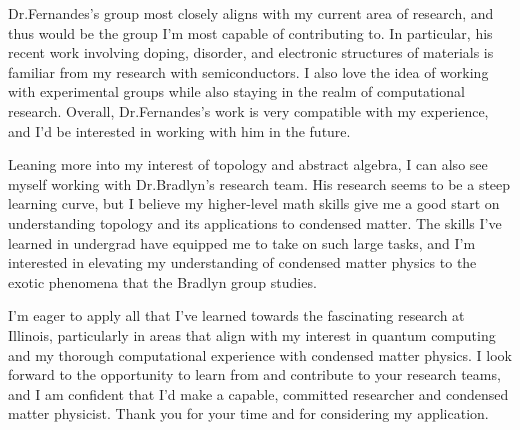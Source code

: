 \documentclass[11pt]{article}
\newcommand{\schoolabbr}{Illinois}
\begin{document}
Dr.\@ Fernandes's group most closely aligns with my current area of research, and thus would be the group I'm most capable of contributing to. In particular, his recent work involving doping, disorder, and electronic structures of materials is familiar from my research with semiconductors. I also love the idea of working with experimental groups while also staying in the realm of computational research. Overall, Dr.\@ Fernandes's work is very compatible with my experience, and I'd be interested in working with him in the future.

Leaning more into my interest of topology and abstract algebra, I can also see myself working with Dr.\@ Bradlyn's research team. His research seems to be a steep learning curve, but I believe my higher-level math skills give me a good start on understanding topology and its applications to condensed matter. The skills I've learned in undergrad have equipped me to take on such large tasks, and I'm interested in elevating my understanding of condensed matter physics to the exotic phenomena that the Bradlyn group studies.

I'm eager to apply all that I've learned towards the fascinating research at \schoolabbr{}, particularly in areas that align with my interest in quantum computing and my thorough computational experience with condensed matter physics. I look forward to the opportunity to learn from and contribute to your research teams, and I am confident that I'd make a capable, committed researcher and condensed matter physicist. Thank you for your time and for considering my application.
\end{document}

